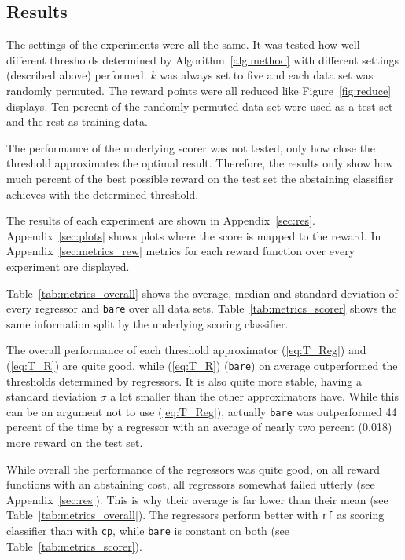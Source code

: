 \documentclass[twoside,11pt]{article}
\begin{document}

\subsection{Results}

The settings of the experiments were all the same.
It was tested how well different thresholds determined by
Algorithm~\ref{alg:method} with different settings
(described above) performed. $k$ was always set to five and
each data set was randomly permuted.
The reward points were all reduced like
Figure~\ref{fig:reduce} displays.
Ten percent of the randomly permuted data set were used as
a test set and the rest as training data.

The performance of the underlying scorer was not tested,
only how close the threshold approximates the optimal
result. Therefore, the results only show how much percent
of the best possible reward on the test set the abstaining
classifier achieves with the determined threshold.

The results of each experiment are shown in
Appendix~\ref{sec:res}.
Appendix~\ref{sec:plots} shows plots where the score
is mapped to the reward.
In Appendix~\ref{sec:metrics_rew} metrics for each reward
function over every experiment are displayed.

Table~\ref{tab:metrics_overall} shows the average, median
and standard deviation of every regressor and \texttt{bare}
over all data sets.
Table~\ref{tab:metrics_scorer} shows the same information
split by the underlying scoring classifier.

The overall performance of each threshold approximator
(\ref{eq:T_Reg}) and (\ref{eq:T_R}) are quite good,
while (\ref{eq:T_R}) (\texttt{bare}) on average
outperformed the thresholds determined by regressors.
It is also quite more stable, having a standard deviation
$\sigma$ a lot smaller than the other approximators have.
While this can be an argument not to use (\ref{eq:T_Reg}),
actually \texttt{bare} was outperformed 44 percent of the
time by a regressor with an average of nearly two percent
(0.018) more reward on the test set.

While overall the performance of the regressors was quite
good, on all reward functions with an abstaining cost,
all regressors somewhat failed utterly
(see Appendix~\ref{sec:res}). This is why their average
is far lower than their mean
(see Table~\ref{tab:metrics_overall}).
The regressors perform better with \texttt{rf} as scoring
classifier than with \texttt{cp}, while \texttt{bare} is
constant on both (see Table~\ref{tab:metrics_scorer}).
\end{document}
